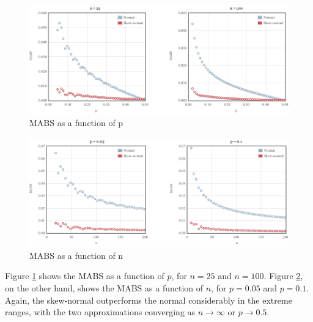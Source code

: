 \documentclass{article}
\begin{document}
\begin{figure}
  \centering
  \includegraphics[width=\textwidth]{../graphs/images/mabs-fixed-n.png}
  \caption{MABS as a function of p}
  \label{fig:mabs-fixed-n}
\end{figure}

\begin{figure}
  \centering
  \includegraphics[width=\textwidth]{../graphs/images/mabs-fixed-p.png}
  \caption{MABS as a function of n}
  \label{fig:mabs-fixed-p}
\end{figure}

Figure \ref{fig:mabs-fixed-n} shows the MABS as a function of $p$, for $n=25$
and $n=100$. Figure \ref{fig:mabs-fixed-p}, on the other hand, shows the MABS
as a function of $n$, for $p=0.05$ and $p=0.1$. Again, the skew-normal
outperforms the normal considerably in the extreme ranges, with the two
approximations converging as $n \rightarrow \infty$ or $p \rightarrow 0.5$.

\clearpage




\end{document}
